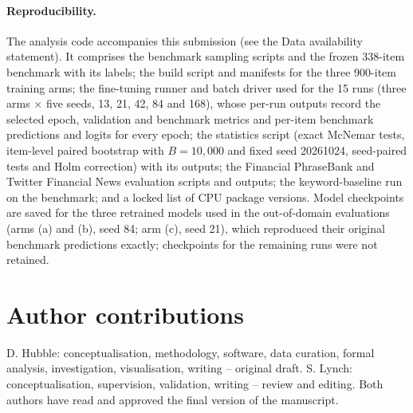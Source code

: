 \documentclass{aims}
\numberwithin{equation}{section}
\begin{document}
\paragraph{Reproducibility.}\label{sec:reprod}
The analysis code accompanies this submission (see the Data availability
statement). It comprises the benchmark sampling scripts and the frozen 338-item
benchmark with its labels; the build script and manifests for the three 900-item
training arms; the fine-tuning runner and batch driver used for the 15 runs (three
arms $\times$ five seeds, 13, 21, 42, 84 and 168), whose per-run outputs record the
selected epoch, validation and benchmark metrics and per-item benchmark predictions
and logits for every epoch; the statistics script (exact McNemar tests, item-level
paired bootstrap with $B = 10{,}000$ and fixed seed 20261024, seed-paired tests and
Holm correction) with its outputs; the Financial PhraseBank and Twitter Financial
News evaluation scripts and outputs; the keyword-baseline run on the benchmark; and a
locked list of CPU package versions. Model checkpoints are saved for the three
retrained models used in the out-of-domain evaluations (arms (a) and (b), seed 84;
arm (c), seed 21), which reproduced their original benchmark predictions exactly;
checkpoints for the remaining runs were not retained.

\section*{Author contributions}
D. Hubble: conceptualisation, methodology, software, data curation, formal analysis,
investigation, visualisation, writing -- original draft. S. Lynch: conceptualisation,
supervision, validation, writing -- review and editing. Both authors have read and
approved the final version of the manuscript.
\end{document}
